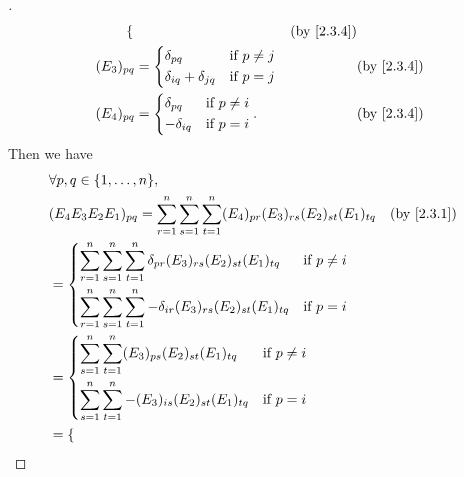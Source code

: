 \begin{proof}[]
\begin{align*}
\begin{dcases}
		                                                \end{dcases}    &  & \by{2.3.4}    \\
		(E_3)_{p q}                                 & = \begin{dcases}
			                                                \delta_{p q}                & \text{if } p \neq j \\
			                                                \delta_{i q} + \delta_{j q} & \text{if } p = j
		                                                \end{dcases}     &  & \by{2.3.4}     \\
		(E_4)_{p q}                                 & = \begin{dcases}
			                                                \delta_{p q}  & \text{if } p \neq i \\
			                                                -\delta_{i q} & \text{if } p = i
		                                                \end{dcases}.                   &  & \by{2.3.4}
	\end{align*}
	Then we have
	\begin{align*}
		 & \forall p, q \in \set{1, \dots, n},                                                                                                             \\
		 & (E_4 E_3 E_2 E_1)_{p q} = \sum_{r = 1}^n \sum_{s = 1}^n \sum_{t = 1}^n (E_4)_{p r} (E_3)_{r s} (E_2)_{s t} (E_1)_{t q}          &  & \by{2.3.1} \\
		 & = \begin{dcases}
			     \sum_{r = 1}^n \sum_{s = 1}^n \sum_{t = 1}^n \delta_{p r} (E_3)_{r s} (E_2)_{s t} (E_1)_{t q}  & \text{if } p \neq i \\
			     \sum_{r = 1}^n \sum_{s = 1}^n \sum_{t = 1}^n -\delta_{i r} (E_3)_{r s} (E_2)_{s t} (E_1)_{t q} & \text{if } p = i
		     \end{dcases}                          \\
		 & = \begin{dcases}
			     \sum_{s = 1}^n \sum_{t = 1}^n (E_3)_{p s} (E_2)_{s t} (E_1)_{t q}  & \text{if } p \neq i \\
			     \sum_{s = 1}^n \sum_{t = 1}^n -(E_3)_{i s} (E_2)_{s t} (E_1)_{t q} & \text{if } p = i
		     \end{dcases}                                                      \\
		 & = \begin{dcases}

\end{dcases}
\end{align*}
\end{proof}
